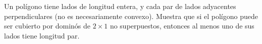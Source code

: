 Un polígono tiene lados de longitud entera, y cada par de lados adyacentes perpendiculares (no es necesariamente convexo). Muestra que si el polígono puede ser cubierto por dominós de $2 \times 1$ no superpuestos, entonces al menos uno de sus lados tiene longitud par. 